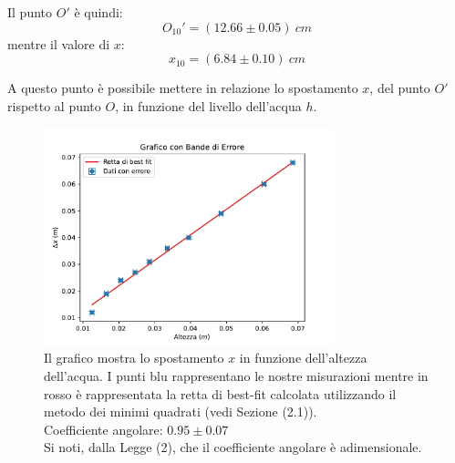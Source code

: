 Il punto $O'$ è quindi:
\begin{equation}
	O_{10}'=(12.66\pm0.05)\ cm
\end{equation}
mentre il valore di $x$:
\begin{equation}
	x_{10}=(6.84\pm 0.10)\ cm
\end{equation}
 
A questo punto è possibile mettere in relazione lo spostamento $x$, del punto $O'$ rispetto al punto $O$, in funzione del livello dell'acqua $h$. 
 
\begin{figure}[H]
	\centering
	\includegraphics[width=0.75\textwidth]{./figures/grafico1}
	\caption{Il grafico mostra lo spostamento $x$ in funzione dell'altezza dell'acqua. I punti blu rappresentano le nostre misurazioni mentre in rosso è rappresentata la retta di best-fit calcolata utilizzando il metodo dei minimi quadrati (vedi Sezione (2.1)).\\
	Coefficiente angolare: $0.95\pm 0.07$\\
	Si noti, dalla Legge (2), che il coefficiente angolare è adimensionale.}
\end{figure} 


